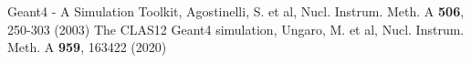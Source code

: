 %
% 
%
%
\begin{thebibliography}{}
%
%
Geant4 - A Simulation Toolkit, Agostinelli, S. et al, Nucl. Instrum. Meth. A \textbf{506}, 250-303 (2003)
%
The CLAS12 Geant4 simulation, Ungaro, M. et al, Nucl. Instrum. Meth. A \textbf{959}, 163422 (2020)

\end{thebibliography}


